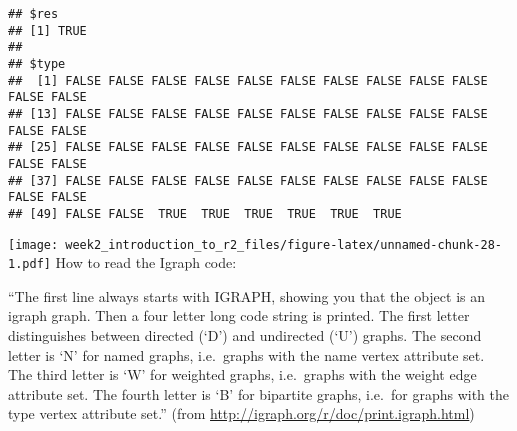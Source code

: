 \documentclass[
]{article}
\newenvironment{Shaded}{\begin{snugshade}}{\end{snugshade}}
\newcommand{\AttributeTok}[1]{\textcolor[rgb]{0.77,0.63,0.00}{#1}}
\newcommand{\DecValTok}[1]{\textcolor[rgb]{0.00,0.00,0.81}{#1}}
\newcommand{\FunctionTok}[1]{\textcolor[rgb]{0.00,0.00,0.00}{#1}}
\newcommand{\NormalTok}[1]{#1}
\newcommand{\OtherTok}[1]{\textcolor[rgb]{0.56,0.35,0.01}{#1}}
\newcommand{\SpecialCharTok}[1]{\textcolor[rgb]{0.00,0.00,0.00}{#1}}
\newcommand{\StringTok}[1]{\textcolor[rgb]{0.31,0.60,0.02}{#1}}
\begin{document}
\begin{verbatim}
## $res
## [1] TRUE
## 
## $type
##  [1] FALSE FALSE FALSE FALSE FALSE FALSE FALSE FALSE FALSE FALSE FALSE FALSE
## [13] FALSE FALSE FALSE FALSE FALSE FALSE FALSE FALSE FALSE FALSE FALSE FALSE
## [25] FALSE FALSE FALSE FALSE FALSE FALSE FALSE FALSE FALSE FALSE FALSE FALSE
## [37] FALSE FALSE FALSE FALSE FALSE FALSE FALSE FALSE FALSE FALSE FALSE FALSE
## [49] FALSE FALSE  TRUE  TRUE  TRUE  TRUE  TRUE  TRUE
\end{verbatim}

\begin{Shaded}
\end{Shaded}

\texttt{[image: week2\_introduction\_to\_r2\_files/figure-latex/unnamed-chunk-28-1.pdf]}
How to read the Igraph code:

``The first line always starts with IGRAPH, showing you that the object
is an igraph graph. Then a four letter long code string is printed. The
first letter distinguishes between directed (`D') and undirected (`U')
graphs. The second letter is `N' for named graphs, i.e.~graphs with the
name vertex attribute set. The third letter is `W' for weighted graphs,
i.e.~graphs with the weight edge attribute set. The fourth letter is `B'
for bipartite graphs, i.e.~for graphs with the type vertex attribute
set.'' (from \url{http://igraph.org/r/doc/print.igraph.html})
\end{document}
